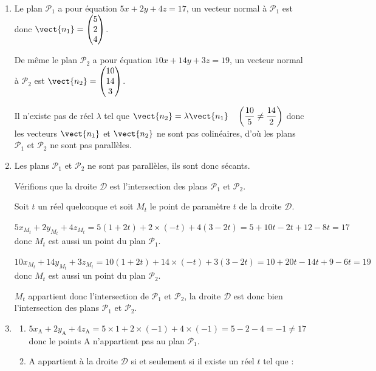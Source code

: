 \bigskip

\begin{enumerate}
\item  Le plan $\mathcal{P}_1$ a pour équation $5x+2y+4z=17$,  un vecteur normal à $\mathcal{P}_1$ est donc $\vect{n_1}=\begin{pmatrix} 5\\2\\4 \end{pmatrix}$. 

De même le plan $\mathcal{P}_2$ a pour équation $10x+14y+3z=19$,  un vecteur normal à $\mathcal{P}_2$ est  $\vect{n_2}=\begin{pmatrix} 10\\14\\3 \end{pmatrix}$. 

Il n'existe pas de réel $\lambda$ tel que $\vect{n_2}=\lambda \vect{n_1} \quad \left(\dfrac{10}{5}\neq\dfrac{14}{2}\right)$  donc les vecteurs $\vect{n_1}$ et $\vect{n_2}$ ne sont pas colinéaires, d'où les plans $\mathcal{P}_1$ et $\mathcal{P}_2$ ne sont pas parallèles.

\item Les plans $\mathcal{P}_1$ et $\mathcal{P}_2$ ne sont pas parallèles,  ils sont donc sécants.

Vérifions que la droite $\mathcal{D}$ est l'intersection des plans  $\mathcal{P}_1$ et $\mathcal{P}_2$.

Soit $t$ un réel quelconque et soit $M_t$ le point de paramètre $t$ de la droite $\mathcal{D}$.

$5x_{M_t}+2y_{M_t}+4z_{M_t}=5 (1+2t)+2\times (-t) +4 (3 - 2t)= 5+10t-2t+12-8t=17$ donc $M_t$ est aussi un point du plan $\mathcal{P}_1$.

$10x_{M_t}+ 14y_{M_t}+ 3z_{M_t}=10 (1 + 2t)+14\times (- t) +3 (3 - 2t)= 10+20t-14t+9-6t=19$ donc $M_t$ est aussi un point du plan $\mathcal{P}_2$.

$M_t$ appartient donc l'intersection de $\mathcal{P}_1$ et $\mathcal{P}_2$,  la droite $\mathcal{D}$ est donc bien  l'intersection des plans  $\mathcal{P}_1$ et $\mathcal{P}_2$.

\item
\begin{enumerate}
\item   $5x_{\mathrm{A}}+2y_{\mathrm{A}}+4z_{\mathrm{A}}=5 \times 1 +2\times (-1) +4 \times (-1)= 5-2-4=-1 \neq 17$ donc le points A n'appartient pas au plan $\mathcal{P}_1$.
	\item  A appartient à la droite $\mathcal{D}$ si et seulement si il existe un réel $t$ tel que : 
	

\end{enumerate}
\end{enumerate}
